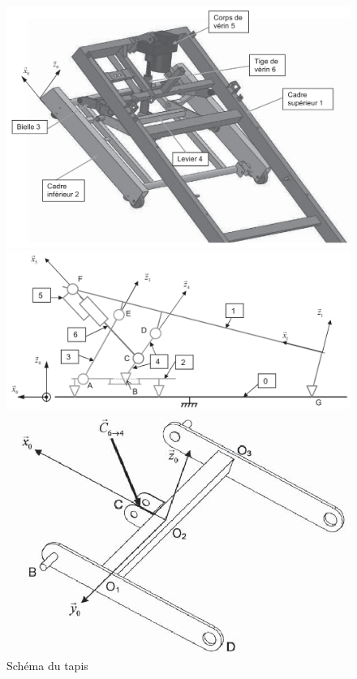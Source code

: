 \begin{figure}[!h]
  \begin{minipage}{0.3\linewidth}
    \centering\includegraphics[width=1\linewidth]{img/tapis_reduc.png}
  \end{minipage}
  \hfill
  \begin{minipage}{0.40\linewidth}
    \centering\includegraphics[width=1\linewidth]{img/tapis_cin.png}
  \end{minipage}
  \hfill
  \begin{minipage}{0.27\linewidth}
   \centering\includegraphics[width=1\linewidth]{img/levier.png}
  \end{minipage}
  \caption{Schéma du tapis}
\end{figure}

